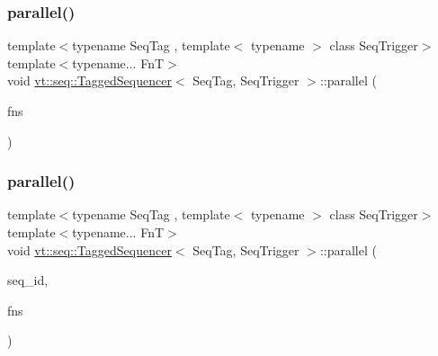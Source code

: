 \subsubsection{\texorpdfstring{parallel()}{parallel()}\hspace{0.1cm}{\footnotesize\ttfamily [1/2]}}
{\footnotesize\ttfamily template$<$typename Seq\+Tag , template$<$ typename $>$ class Seq\+Trigger$>$ \\
template$<$typename... FnT$>$ \\
void \hyperlink{structvt_1_1seq_1_1_tagged_sequencer}{vt\+::seq\+::\+Tagged\+Sequencer}$<$ Seq\+Tag, Seq\+Trigger $>$\+::parallel (\begin{DoxyParamCaption}\item[{FnT \&\&...}]{fns }\end{DoxyParamCaption})}

\mbox{\label{structvt_1_1seq_1_1_tagged_sequencer_a7c4bc9187cec9dd34746fb8703a1058c}} 
\subsubsection{\texorpdfstring{parallel()}{parallel()}\hspace{0.1cm}{\footnotesize\ttfamily [2/2]}}
{\footnotesize\ttfamily template$<$typename Seq\+Tag , template$<$ typename $>$ class Seq\+Trigger$>$ \\
template$<$typename... FnT$>$ \\
void \hyperlink{structvt_1_1seq_1_1_tagged_sequencer}{vt\+::seq\+::\+Tagged\+Sequencer}$<$ Seq\+Tag, Seq\+Trigger $>$\+::parallel (\begin{DoxyParamCaption}\item[{\hyperlink{structvt_1_1seq_1_1_tagged_sequencer_a1c8ee839258d0f88c49ef660267a81d5}{Seq\+Type} const \&}]{seq\+\_\+id,  }\item[{FnT \&\&...}]{fns }\end{DoxyParamCaption})}

\mbox{\label{structvt_1_1seq_1_1_tagged_sequencer_a22592981151ecba9f8047cb6317ef84a}} 
